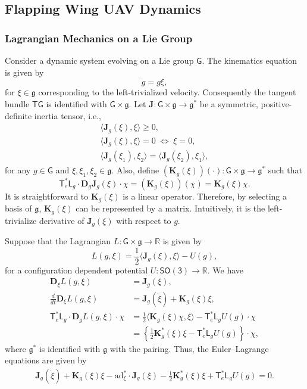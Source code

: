 \documentclass[10pt,draft]{article}
\newcommand{\braces}[1]{\ensuremath{\left\{ #1 \right\}}}
\newcommand{\pair}[1]{\ensuremath{\langle #1 \rangle}}
\newcommand{\SO}{\ensuremath{\mathsf{SO(3)}}}
\newcommand{\T}{\ensuremath{\mathsf{T}}}
\renewcommand{\L}{\ensuremath{\mathsf{L}}}
\renewcommand{\Re}{\ensuremath{\mathbb{R}}}
\newcommand{\D}{\ensuremath{\mathbf{D}}}
\newcommand{\ad}{\ensuremath{\mathrm{ad}}}
\newcommand{\G}{\ensuremath{\mathsf{G}}}
\newcommand{\g}{\ensuremath{\mathfrak{g}}}
\begin{document}
\clearpage\newpage

\subsection{Flapping Wing UAV Dynamics}

\subsubsection{Lagrangian Mechanics on a Lie Group}

Consider a dynamic system evolving on a Lie group $\G$. 
The kinematics equation is given by
\[
    \dot g = g \xi,
\]
for $\xi\in\g$ corresponding to the left-trivialized velocity.
Consequently the tangent bundle $\T\G$ is identified with $\G\times \g$.
Let $\mathbf{J}:\G\times \g\rightarrow \g^*$ be a symmetric, positive-definite inertia tensor, i.e., 
\begin{gather*}
    \pair{\mathbf{J}_g(\xi), \xi} \geq 0,\\
    \pair{\mathbf{J}_g(\xi), \xi} = 0\; \Leftrightarrow \; \xi=0, \\ 
    \pair{\mathbf{J}_g(\xi_1), \xi_2} = \pair{\mathbf{J}_g(\xi_2), \xi_1},
\end{gather*}
for any $g\in\G$ and $\xi,\xi_1,\xi_2\in\g$. 
Also, define $(\mathbf{K}_g(\xi))(\cdot):\G\times \g\rightarrow \g^*$ such that
\[
    \T_e^* \L_g \cdot \D_g \mathbf{J}_g(\xi) \cdot \chi = (\mathbf{K}_g(\xi)) (\chi) = \mathbf{K}_g(\xi)\chi. 
\]
It is straightforward to $\mathbf{K}_g(\xi)$ is a linear operator.
Therefore, by selecting a basis of $\g$, $\mathbf{K}_g(\xi)$ can be represented by a matrix.
Intuitively, it is the left-trivialize derivative of $\mathbf{J}_g(\xi)$ with respect to $g$. 

Suppose that the Lagrangian $L:\G\times \g \rightarrow \Re$ is given by
\[
    L(g,\xi) = \frac{1}{2} \pair{ \mathbf{J}_g(\xi), \xi } - U(g),
\]
for a configuration dependent potential $U:\SO\rightarrow \Re$. 
We have
\begin{align*}
    \D_\xi L(g,\xi) & = \mathbf{J}_g(\xi),\\
    \frac{d}{dt} \D_\xi L(g,\xi) & = \mathbf{J}_g(\dot \xi) + \mathbf{K}_g(\xi)\xi,\\
    \T^*_e \L_g \cdot \D_g L(g,\xi)\cdot\chi & = \frac{1}{2}\pair{\mathbf{K}_g(\xi)\chi , \xi} - \T_e^* \L_g U(g)\cdot \chi\\
                                             & = \braces{ \frac{1}{2}\mathbf{K}_g^*(\xi)\xi - \T^*_e \L_g U(g)} \cdot \chi,
\end{align*}
where $\g^*$ is identified with $\g$ with the pairing. 
Thus, the Euler--Lagrange equations are given by
\begin{gather}
    \mathbf{J}_g(\dot \xi) + \mathbf{K}_g(\xi)\xi - \ad^*_\xi \cdot \mathbf{J}_g(\xi)  - \frac{1}{2}\mathbf{K}^*_g(\xi)\xi + \T_e^* \L_g U(g) =0.
\end{gather}
\end{document}

